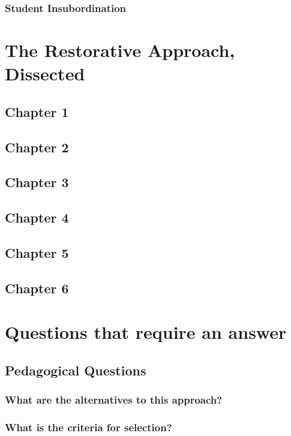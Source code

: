 \documentclass[12pt]{article}
\begin{document}
	\subsubsection{Student Insubordination}
	
	
	\section{The Restorative Approach, Dissected}
	\subsection{Chapter 1}
	\subsection{Chapter 2}
	\subsection{Chapter 3}
	\subsection{Chapter 4}
	\subsection{Chapter 5}
	\subsection{Chapter 6}

	\section{Questions that require an answer}
	\subsection{Pedagogical Questions}
	\subsubsection{What are the alternatives to this approach?}
	\subsubsection{What is the criteria for selection?}
\end{document}
